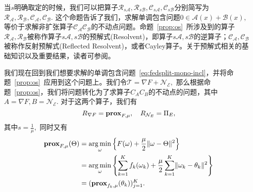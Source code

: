 当$s$明确取定的时候，我们可以把算子$\mathcal{R}_{s\mathcal{A}}, \mathcal{R}_{s\mathcal{B}}, \mathcal{C}_{s\mathcal{A}}, \mathcal{C}_{s\mathcal{B}}$分别简写为$\mathcal{R}_{\mathcal{A}}, \mathcal{R}_{\mathcal{B}}, \mathcal{C}_{\mathcal{A}}, \mathcal{C}_{\mathcal{B}}.$ 这个命题告诉了我们，求解单调包含问题$0 \in \mathcal{A}(x) + \mathcal{B}(x),$等价于求解非扩张算子$\mathcal{C}_{\mathcal{A}} \mathcal{C}_{\mathcal{B}}$的不动点问题。命题~\ref{prop:os}~所涉及到的算子$\mathcal{R}_{\mathcal{A}}, \mathcal{R}_{\mathcal{B}}$被称作算子$s\mathcal{A}, s\mathcal{B}$的预解式(Resolvent)，即算子$s\mathcal{A}, s\mathcal{B}$的逆算子；$\mathcal{C}_{\mathcal{A}}, \mathcal{C}_{\mathcal{B}}$被称作反射预解式(Reflected Resolvent)，或者Cayley算子。关于预解式相关的基础知识以及重要结果，读者可参阅\parencite[\S 2.5]{ryu2022large}。

我们现在回到我们想要求解的单调包含问题~\eqref{eq:fedsplit-mono-incl}，并将命题~\ref{prop:os}~应用到这个问题上。我们令$\mathcal{T} = \nabla F + \mathcal{N}_{\mathcal{E}},$ 那么根据命题~\ref{prop:os}，我们将问题转化为了求算子$C_AC_B$的不动点的问题，其中$A = \nabla F, B = \mathcal{N}_{\mathcal{E}}.$ 对于这两个算子，我们有
$$R_{\nabla F} = \mathbf{prox}_{F, \mu}, \quad R_{\mathcal{N}_E} = \Pi_{E},$$
其中$s = \frac{1}{\mu},$ 同时又有
\begin{align*}
\mathbf{prox}_{F, \mu}(\Theta) & = \operatorname*{arg\,min}_{\omega} \left\{ F(\omega) + \frac{\mu}{2} \lVert \omega - \Theta \rVert^2 \right\} \\
& = \operatorname*{arg\,min}_{\omega} \left\{ \sum_{k=1}^K f_k(\omega_k) + \frac{\mu}{2} \sum_{k=1}^K \lVert \omega_k - \theta_k \rVert^2 \right\} \\
& = (\mathbf{prox}_{f_k, \mu}(\theta_k))_{j=1}^K.
\end{align*}





